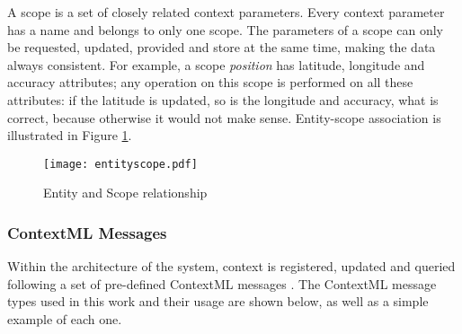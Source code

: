 A scope is a set of closely related context parameters. Every context parameter has a name and belongs to only one scope. The parameters of a scope can only be requested, updated, provided and store at the same time, making the data always consistent. For example, a scope \textit{position} has latitude, longitude and accuracy attributes; any operation on this scope is performed on all these attributes: if the latitude is updated, so is the longitude and accuracy, what is correct, because otherwise it would not make sense. Entity-scope association is illustrated in Figure \ref{fig:entityscope}. \par

\begin{figure}
	\centering
	\texttt{[image: entityscope.pdf]}
	\caption{Entity and Scope relationship}
	\label{fig:entityscope}
	\cite{knappmeyer2010contextml}
	
\end{figure}

\subsubsection{ContextML Messages}
Within the architecture of the system, context is registered, updated and queried following a set of pre-defined ContextML messages \cite{knappmeyer2010contextml}. The ContextML message types used in this work and their usage are shown below, as well as a simple example of each one.

